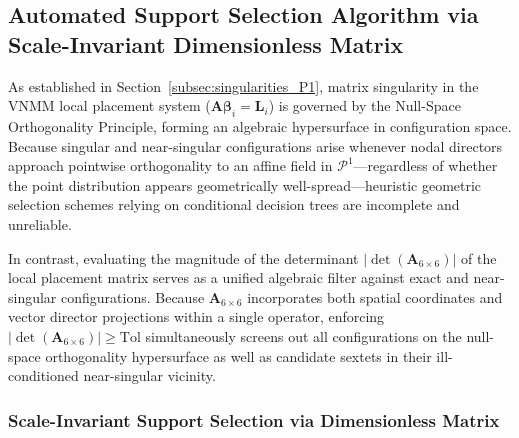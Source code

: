 \documentclass[preprint,12pt]{elsarticle}
\begin{document}
\subsection{Automated Support Selection Algorithm via Scale-Invariant Dimensionless Matrix}
\label{sec:support_selection_algorithm}

As established in Section~\ref{subsec:singularities_P1}, matrix singularity in the VNMM local placement system ($\mathbf{A} \boldsymbol{\beta}_i = \mathbf{L}_i$) is governed by the Null-Space Orthogonality Principle, forming an algebraic hypersurface in configuration space. Because singular and near-singular configurations arise whenever nodal directors approach pointwise orthogonality to an affine field in $\mathcal{P}^1$---regardless of whether the point distribution appears geometrically well-spread---heuristic geometric selection schemes relying on conditional decision trees are incomplete and unreliable.

In contrast, evaluating the magnitude of the determinant $|\det(\mathbf{A}_{6\times6})|$ of the local placement matrix serves as a unified algebraic filter against exact and near-singular configurations. Because $\mathbf{A}_{6\times6}$ incorporates both spatial coordinates and vector director projections within a single operator, enforcing $|\det(\mathbf{A}_{6\times6})| \ge \mathrm{Tol}$ simultaneously screens out all configurations on the null-space orthogonality hypersurface as well as candidate sextets in their ill-conditioned near-singular vicinity.

\subsubsection{Scale-Invariant Support Selection via Dimensionless Matrix}
\label{subsec:scale_invariant_criterion}
\end{document}
